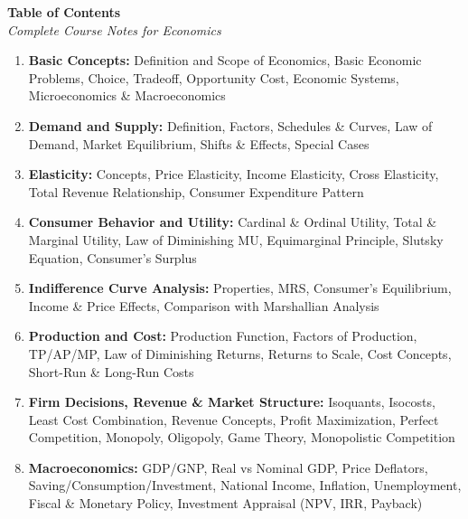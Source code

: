 \documentclass[10pt,a4paper]{article}
\begin{document}


\thispagestyle{empty}
\begin{center}
{\LARGE \textbf{Table of Contents}}\\[1cm]
{\normalsize \textit{Complete Course Notes for Economics}}\\[1.5cm]
\end{center}

\vspace{0.5cm}

\begin{enumerate}[leftmargin=*, itemsep=0.8cm]
    \item[1.] \textbf{Basic Concepts:} Definition and Scope of Economics, Basic Economic Problems, Choice, Tradeoff, Opportunity Cost, Economic Systems, Microeconomics \& Macroeconomics
    
    \item[2.] \textbf{Demand and Supply:} Definition, Factors, Schedules \& Curves, Law of Demand, Market Equilibrium, Shifts \& Effects, Special Cases
    
    \item[3.] \textbf{Elasticity:} Concepts, Price Elasticity, Income Elasticity, Cross Elasticity, Total Revenue Relationship, Consumer Expenditure Pattern
    
    \item[4.] \textbf{Consumer Behavior and Utility:} Cardinal \& Ordinal Utility, Total \& Marginal Utility, Law of Diminishing MU, Equimarginal Principle, Slutsky Equation, Consumer's Surplus
    
    \item[5.] \textbf{Indifference Curve Analysis:} Properties, MRS, Consumer's Equilibrium, Income \& Price Effects, Comparison with Marshallian Analysis
    
    \item[6.] \textbf{Production and Cost:} Production Function, Factors of Production, TP/AP/MP, Law of Diminishing Returns, Returns to Scale, Cost Concepts, Short-Run \& Long-Run Costs
    
    \item[7.] \textbf{Firm Decisions, Revenue \& Market Structure:} Isoquants, Isocosts, Least Cost Combination, Revenue Concepts, Profit Maximization, Perfect Competition, Monopoly, Oligopoly, Game Theory, Monopolistic Competition
    
    \item[8.] \textbf{Macroeconomics:} GDP/GNP, Real vs Nominal GDP, Price Deflators, Saving/Consumption/Investment, National Income, Inflation, Unemployment, Fiscal \& Monetary Policy, Investment Appraisal (NPV, IRR, Payback)
\end{enumerate}
\end{document}
